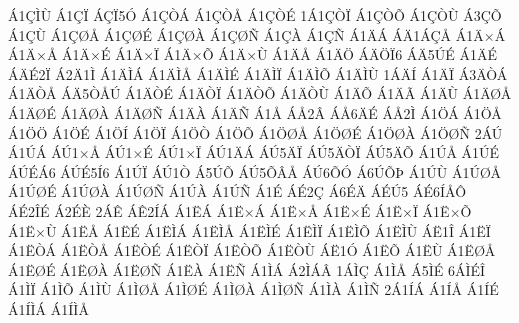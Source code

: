 {^^c11^^c7^^cc^^d9
^^c11^^c7^^cf
^^c1^^c7^^cf5^^d3
^^c11^^c7^^d2^^c1
^^c11^^c7^^d2^^c5
^^c11^^c7^^d2^^c9
1^^c11^^c7^^d2^^cf
^^c11^^c7^^d2^^d5
^^c11^^c7^^d2^^d9
^^c13^^c7^^d5
^^c11^^c7^^d9
^^c11^^c7^^d8^^c5
^^c11^^c7^^d8^^c9
^^c11^^c7^^d8^^c0
^^c11^^c7^^d8^^d1
^^c11^^c7^^c0
^^c11^^c7^^d1
^^c11^^c4^^c1
^^c1^^c41^^c1^^c7^^c5
^^c11^^c4^^d7^^c1
^^c11^^c4^^d7^^c5
^^c11^^c4^^d7^^c9
^^c11^^c4^^d7^^cf
^^c11^^c4^^d7^^d5
^^c11^^c4^^d7^^d9
^^c11^^c4^^c5
^^c11^^c4^^d6
^^c1^^c4^^d6^^cf6
^^c1^^c45^^da^^c9
^^c11^^c4^^c9
^^c1^^c4^^c92^^cf
^^c12^^c41^^cc
^^c11^^c4^^cc^^c1
^^c11^^c4^^cc^^c5
^^c11^^c4^^cc^^c9
^^c11^^c4^^cc^^cf
^^c11^^c4^^cc^^d5
^^c11^^c4^^cc^^d9
1^^c1^^c4^^cd
^^c11^^c4^^cf
^^c13^^c4^^d2^^c1
^^c11^^c4^^d2^^c5
^^c1^^c45^^d2^^c5^^da
^^c11^^c4^^d2^^c9
^^c11^^c4^^d2^^cf
^^c11^^c4^^d2^^d5
^^c11^^c4^^d2^^d9
^^c11^^c4^^d5
^^c11^^c4^^c3
^^c11^^c4^^d9
^^c11^^c4^^d8^^c5
^^c11^^c4^^d8^^c9
^^c11^^c4^^d8^^c0
^^c11^^c4^^d8^^d1
^^c11^^c4^^c0
^^c11^^c4^^d1
^^c11^^c5
^^c1^^c52^^c2
^^c1^^c56^^c4^^c9
^^c1^^c52^^cc
^^c11^^d6^^c1
^^c11^^d6^^c5
^^c11^^d6^^d6
^^c11^^d6^^c9
^^c11^^d6^^cd
^^c11^^d6^^cf
^^c11^^d6^^d2
^^c11^^d6^^d5
^^c11^^d6^^d8^^c5
^^c11^^d6^^d8^^c9
^^c11^^d6^^d8^^c0
^^c11^^d6^^d8^^d1
2^^c1^^da
^^c11^^da^^c1
^^c1^^da1^^d7^^c5
^^c1^^da1^^d7^^c9
^^c1^^da1^^d7^^cf
^^c1^^da1^^c4^^c1
^^c1^^da5^^c4^^cf
^^c1^^da5^^c4^^d2^^cf
^^c1^^da5^^c4^^d5
^^c11^^da^^c5
^^c11^^da^^c9
^^c1^^da^^c9^^c16
^^c1^^da^^c95^^cd6
^^c11^^da^^cf
^^c1^^da1^^d2
^^c15^^da^^d5
^^c1^^da5^^d5^^c2^^c5
^^c1^^da6^^d5^^d3
^^c16^^da^^d5^^de
^^c11^^da^^d9
^^c11^^da^^d8^^c5
^^c11^^da^^d8^^c9
^^c11^^da^^d8^^c0
^^c11^^da^^d8^^d1
^^c11^^da^^c0
^^c11^^da^^d1
^^c11^^c9
^^c1^^c92^^c7
^^c16^^c9^^c4
^^c1^^c9^^da5
^^c1^^c96^^cd^^c5^^d4
^^c1^^c92^^ce^^c9
^^c12^^c9^^c8
2^^c1^^ca
^^c1^^ca2^^cd^^c1
^^c11^^cb^^c1
^^c11^^cb^^d7^^c1
^^c11^^cb^^d7^^c5
^^c11^^cb^^d7^^c9
^^c11^^cb^^d7^^cf
^^c11^^cb^^d7^^d5
^^c11^^cb^^d7^^d9
^^c11^^cb^^c5
^^c11^^cb^^c9
^^c11^^cb^^cc^^c1
^^c11^^cb^^cc^^c5
^^c11^^cb^^cc^^c9
^^c11^^cb^^cc^^cf
^^c11^^cb^^cc^^d5
^^c11^^cb^^cc^^d9
^^c1^^cb1^^ce
^^c11^^cb^^cf
^^c11^^cb^^d2^^c1
^^c11^^cb^^d2^^c5
^^c11^^cb^^d2^^c9
^^c11^^cb^^d2^^cf
^^c11^^cb^^d2^^d5
^^c11^^cb^^d2^^d9
^^c1^^cb1^^d3
^^c11^^cb^^d5
^^c11^^cb^^d9
^^c11^^cb^^d8^^c5
^^c11^^cb^^d8^^c9
^^c11^^cb^^d8^^c0
^^c11^^cb^^d8^^d1
^^c11^^cb^^c0
^^c11^^cb^^d1
^^c11^^cc^^c1
^^c12^^cc^^c1^^c2
1^^c1^^cc^^c7
^^c11^^cc^^c5
^^c15^^cc^^c9
6^^c1^^cc^^c9^^ce
^^c11^^cc^^cf
^^c11^^cc^^d5
^^c11^^cc^^d9
^^c11^^cc^^d8^^c5
^^c11^^cc^^d8^^c9
^^c11^^cc^^d8^^c0
^^c11^^cc^^d8^^d1
^^c11^^cc^^c0
^^c11^^cc^^d1
2^^c11^^cd^^c1
^^c11^^cd^^c5
^^c11^^cd^^c9
^^c11^^cd^^cc^^c1
^^c11^^cd^^cc^^c5
}
